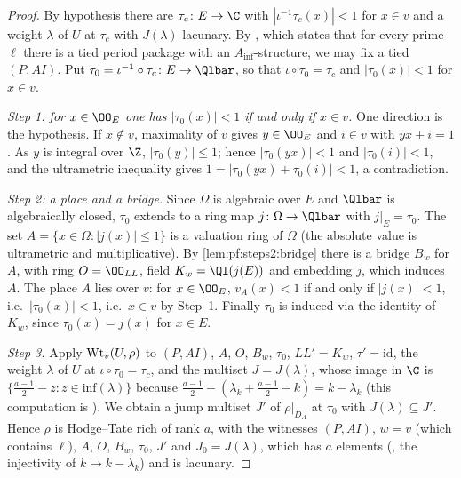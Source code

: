 \begin{proof}
By hypothesis there are $\tau_c\colon E\to\C$ with $|\iota^{-1}\tau_c(x)|<1$ for $x\in v$ and a
weight $\lambda$ of $U$ at $\tau_c$ with $J(\lambda)$ lacunary. By
, which states that for every prime $\ell$ there
is a tied period package with an $A_{\inf}$-structure, we may fix a tied $(P,AI)$. Put
$\tau_0=\iota^{-1}\circ\tau_c\colon E\to\Qlbar$, so that $\iota\circ\tau_0=\tau_c$ and
$|\tau_0(x)|<1$ for $x\in v$.

\emph{Step 1: for $x\in\OO_E$ one has $|\tau_0(x)|<1$ if and only if $x\in v$.} One direction is the
hypothesis. If $x\notin v$, maximality of $v$ gives $y\in\OO_E$ and $i\in v$ with $yx+i=1$. As $y$
is integral over $\Z$, $|\tau_0(y)|\le1$; hence $|\tau_0(yx)|<1$ and $|\tau_0(i)|<1$, and the
ultrametric inequality gives $1=|\tau_0(yx)+\tau_0(i)|<1$, a contradiction.

\emph{Step 2: a place and a bridge.} Since $\Omega$ is algebraic over $E$ and $\Qlbar$ is
algebraically closed, $\tau_0$ extends to a ring map $j\colon\Omega\to\Qlbar$ with $j|_E=\tau_0$. The
set $A=\{x\in\Omega:|j(x)|\le1\}$ is a valuation ring of $\Omega$ (the absolute value is
ultrametric and multiplicative). By \cref{lem:pf:steps2:bridge} there is a bridge $B_w$ for $A$, with
ring $O=\OO_{LL}$, field $K_w=\Ql(j(E))$ and embedding $j$, which induces $A$. The place $A$ lies
over $v$: for $x\in\OO_E$,
$v_A(x)<1$ if and only if $|j(x)|<1$, i.e.\ $|\tau_0(x)|<1$, i.e.\ $x\in v$ by Step~1. Finally
$\tau_0$ is induced via the identity of $K_w$, since $\tau_0(x)=j(x)$ for $x\in E$.

\emph{Step 3.} Apply $\mathrm{Wt}_v(U,\rho)$ to $(P,AI)$, $A$, $O$, $B_w$, $\tau_0$, $LL'=K_w$,
$\tau'=\mathrm{id}$, the weight $\lambda$ of $U$ at $\iota\circ\tau_0=\tau_c$, and the multiset
$J=J(\lambda)$, whose image in $\C$ is $\{\frac{a-1}2-z:z\in\mathrm{inf}(\lambda)\}$ because
$\frac{a-1}2-(\lambda_k+\frac{a-1}2-k)=k-\lambda_k$ (this computation is
). We obtain a jump multiset $J'$ of $\rho|_{D_A}$ at
$\tau_0$ with $J(\lambda)\subseteq J'$. Hence $\rho$ is Hodge--Tate rich of rank $a$, with the
witnesses $(P,AI)$, $w=v$ (which contains $\ell$), $A$, $O$, $B_w$, $\tau_0$, $J'$ and
$J_0=J(\lambda)$, which has $a$ elements (, the
injectivity of $k\mapsto k-\lambda_k$) and is lacunary.
\end{proof}

